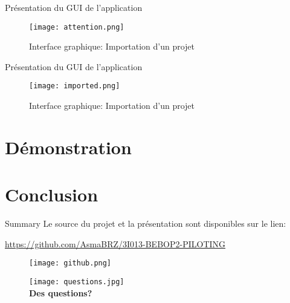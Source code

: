 \documentclass[french]{beamer}
\begin{document}
\begin{frame}[fragile]{Présentation du GUI de l’application}
\begin{figure}
 \texttt{[image: attention.png]}
\caption{Interface graphique: Importation d'un projet}
\end{figure}
\end{frame}

\begin{frame}[fragile]{Présentation du GUI de l’application}
\begin{figure}
 \texttt{[image: imported.png]}
\caption{Interface graphique: Importation d'un projet}
\end{figure}
\end{frame}

\section{Démonstration}

\section{Conclusion}

\begin{frame}{Summary}
  Le source du projet et la présentation sont disponibles sur le lien:
  \begin{center}\url{https://github.com/AsmaBRZ/3I013-BEBOP2-PILOTING}\end{center}
 \begin{center}
 \begin{figure}
 \texttt{[image: github.png]}
 \end{figure}
 \end{center}

\end{frame}
\begin{frame}
\begin{figure}
 \texttt{[image: questions.jpg]}
 \\
 \textbf{Des questions?} 
\end{figure}
\end{frame}
\end{document}
